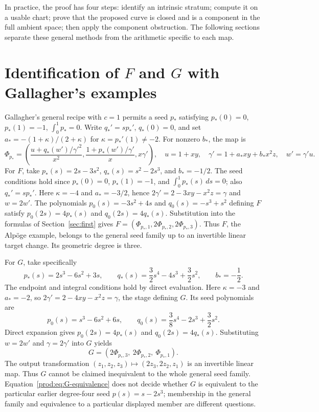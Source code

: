 \documentclass[11pt]{article}
\numberwithin{equation}{section}
\theoremstyle{plain}
\theoremstyle{definition}
\theoremstyle{remark}
\begin{document}
In practice, the proof has four steps: identify an intrinsic stratum;
compute it on a usable chart; prove that the proposed curve is closed
and is a component in the full ambient space; then apply the component
obstruction. The following sections separate these general methods from
the arithmetic specific to each map.

\section{Identification of \texorpdfstring{$F$ and $G$}{F and G} with Gallagher's examples}\label{prod:sec:G}
Gallagher's general recipe \cite[Section 3]{Gallagher} with $c=1$ permits a seed
$p_*$ satisfying $p_*(0)=0$, $p_*(1)=-1$, $\int_0^1p_*=0$.
Write $q_*'=sp_*'$, $q_*(0)=0$, and set
$a_*=-(1+\kappa)/(2+\kappa)$ for $\kappa=p_*'(1)\ne-2$.
For nonzero $b_*$, the map is
\[
 \Phi_{p_*}=\left(\frac{u+q_*(w')/\gamma'^2}{x^2},
 \frac{1+p_*(w')/\gamma'}x,x\gamma'\right),
 \quad u=1+xy,\quad \gamma'=1+a_*xy+b_*x^2z,\quad w'=\gamma'u.
\]
For $F$, take $p_*(s)=2s-3s^2$, $q_*(s)=s^2-2s^3$,
and $b_*=-1/2$. The seed conditions hold since $p_*(0)=0$,
$p_*(1)=-1$, and $\int_0^1p_*(s)\,ds=0$; also $q_*'=sp_*'$.
Here $\kappa=-4$ and $a_*=-3/2$, hence
$2\gamma'=2-3xy-x^2z=\gamma$ and $w=2w'$.
The polynomials $p_0(s)=-3s^2+4s$ and $q_0(s)=-s^3+s^2$
defining $F$ satisfy $p_0(2s)=4p_*(s)$ and $q_0(2s)=4q_*(s)$.
Substitution into the formulas of Section~\ref{sec:first} gives
$F=(\Phi_{p_*,1},2\Phi_{p_*,2},2\Phi_{p_*,3})$.
Thus $F$, the Alp\"oge example, belongs to the general seed family up to
an invertible linear target change. Its geometric degree is three.

For $G$, take specifically
\[
 p_*(s)=2s^3-6s^2+3s,\qquad
 q_*(s)=\frac32s^4-4s^3+\frac32s^2,
 \qquad b_*=-\frac12.
\]
The endpoint and integral conditions hold by direct evaluation.
Here $\kappa=-3$ and $a_*=-2$, so
$2\gamma'=2-4xy-x^2z=\gamma$, the stage defining $G$.
Its seed polynomials are
\[
 p_0(s)=s^3-6s^2+6s,\qquad
 q_0(s)=\frac38s^4-2s^3+\frac32s^2.
\]
Direct expansion gives $p_0(2s)=4p_*(s)$ and $q_0(2s)=4q_*(s)$.
Substituting $w=2w'$ and $\gamma=2\gamma'$ into $G$ yields
\begin{equation}\label{prod:eq:G-equivalence}
 \boxed{\ G=(2\Phi_{p_*,3},\ 2\Phi_{p_*,2},\ \Phi_{p_*,1}).\ }
\end{equation}
The output transformation $(z_1,z_2,z_3)\mapsto(2z_3,2z_2,z_1)$ is an
invertible linear map. Thus $G$ cannot be claimed inequivalent to the whole
general seed family. Equation~\eqref{prod:eq:G-equivalence} does not decide
whether $G$ is equivalent to the particular earlier degree-four seed
$p(s)=s-2s^3$; membership in the general family and equivalence to a
particular displayed member are different questions.
\end{document}
